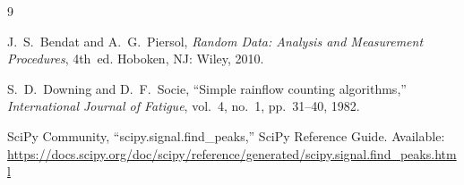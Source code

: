 \documentclass[11pt,a4paper]{article}
\begin{document}
\begin{thebibliography}{9}

J.~S.~Bendat and A.~G.~Piersol,
\emph{Random Data: Analysis and Measurement Procedures}, 4th~ed.
Hoboken, NJ: Wiley, 2010.

S.~D.~Downing and D.~F.~Socie,
``Simple rainflow counting algorithms,''
\emph{International Journal of Fatigue}, vol.~4, no.~1, pp.~31--40, 1982.

SciPy Community,
``scipy.signal.find\_peaks,'' SciPy Reference Guide.
Available: \url{https://docs.scipy.org/doc/scipy/reference/generated/scipy.signal.find_peaks.html}

\end{thebibliography}
\end{document}
